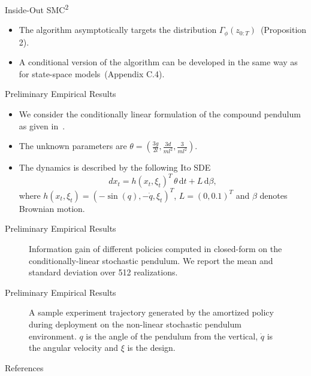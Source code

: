 \documentclass[10pt, aspectratio=1610]{beamer}
\newcommand{\dd}{\mathrm{d}}
\begin{document}
    \begin{frame}{Inside-Out \texorpdfstring{SMC\textsuperscript{2}}{SMC2}}
      \begin{itemize}
        \item The algorithm asymptotically targets the distribution $\Gamma_\phi(z_{0:T})$~(Proposition 2).
        \item A conditional version of the algorithm can be developed in the same way as for state-space models~(Appendix C.4).
      \end{itemize}
    \end{frame}

    \begin{frame}{Preliminary Empirical Results}
      \begin{itemize}
        \item We consider the conditionally linear formulation of the compound pendulum as given in~\citet{belusov2019belief}.
        \item The unknown parameters are $\theta = \displaystyle \left(\frac{3g}{2l}, \frac{3d}{ml^2}, \frac{3}{ml^2} \right)$.
        \item The dynamics is described by the following Ito SDE
          \begin{equation}
            dx_t = h(x_t, \xi_t)^T \, \theta \, \dd t + L \, \dd \beta,
          \end{equation}
          where $h(x_t, \xi_t) = (-\sin(q), -\dot{q}, \xi_t)^T$, $L = (0, 0.1)^T$ and $\beta$ denotes Brownian motion.
      \end{itemize}
    \end{frame}

    \begin{frame}{Preliminary Empirical Results}
      \begin{figure}[t]
        
        \vspace{-0.25cm}
        \caption{Information gain of different policies computed in closed-form on the conditionally-linear stochastic pendulum. We report the mean and standard deviation over 512 realizations.}
        \label{fig:pendulum_info_gain}
      \end{figure}
    \end{frame}

    \begin{frame}{Preliminary Empirical Results}
      \begin{figure}[!h]
        \centering
        
        \vspace{-0.25cm}
        \caption{A sample experiment trajectory generated by the amortized policy during deployment on the non-linear stochastic pendulum environment. $q$ is the angle of the pendulum from the vertical, $\dot{q}$ is the angular velocity and $\xi$ is the design.}
        \label{fig:pendulum_sample_trajectory}
      \end{figure}
    \end{frame}

  \begin{frame}[t, allowframebreaks]{References}
    
  \end{frame}
\end{document}
